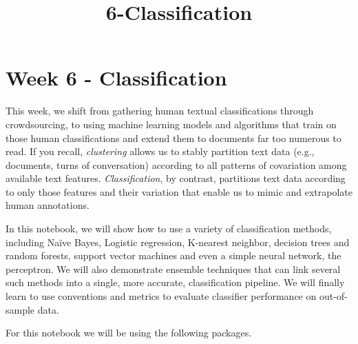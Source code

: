 \documentclass[11pt]{article}
\title{6-Classification}
\begin{document}
    
    
    \maketitle
    
    

    
    \section{Week 6 - Classification}\label{week-6---classification}

This week, we shift from gathering human textual classifications through
crowdsourcing, to using machine learning models and algorithms that
train on those human classifications and extend them to documents far
too numerous to read. If you recall, \emph{clustering} allows us to
stably partition text data (e.g., documents, turns of conversation)
according to all patterns of covariation among available text features.
\emph{Classification}, by contrast, partitions text data according to
only those features and their variation that enable us to mimic and
extrapolate human annotations.

In this notebook, we will show how to use a variety of classification
methods, including Naïve Bayes, Logistic regression, K-nearest neighbor,
decision trees and random forests, support vector machines and even a
simple neural network, the perceptron. We will also demonstrate ensemble
techniques that can link several such methods into a single, more
accurate, classification pipeline. We will finally learn to use
conventions and metrics to evaluate classifier performance on
out-of-sample data.

For this notebook we will be using the following packages.
\end{document}
